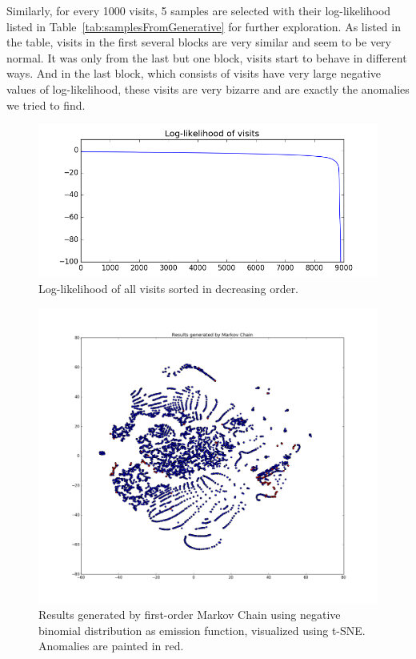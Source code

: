 Similarly, for every 1000 visits, 5 samples are selected with their log-likelihood listed in Table~\ref{tab:samplesFromGenerative} for further exploration. As listed in the table, visits in the first several blocks are very similar and seem to be very normal. It was only from the last but one block, visits start to behave in different ways. And in the last block, which consists of visits have very large negative values of log-likelihood, these visits are very bizarre and are exactly the anomalies we tried to find.


\begin{figure}[!ht]
	\begin{center}
		\includegraphics[width=\textwidth]{images/likelihood}
		\caption{Log-likelihood of all visits sorted in decreasing order.}
		\label{fig:likelihood}
	\end{center}
\end{figure}

\begin{figure}[!ht]
	\begin{center}
		\includegraphics[width=\textwidth]{images/MarkovResult}
		\caption{Results generated by first-order Markov Chain using negative binomial distribution as emission function, visualized using t-SNE. Anomalies are painted in red.}
		\label{fig:MarkovResult}
	\end{center}
\end{figure}


